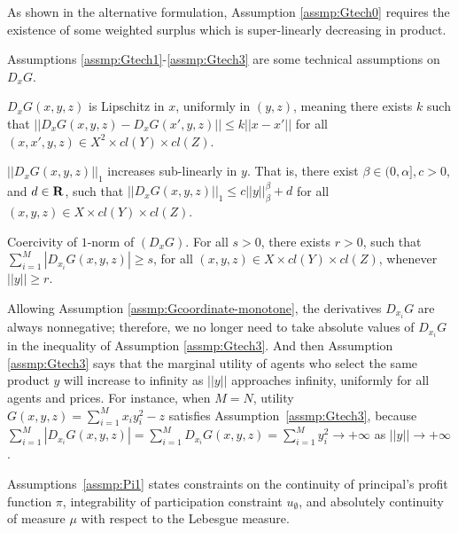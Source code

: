 As shown in the alternative formulation, Assumption \ref{assmp:Gtech0} requires the existence of some weighted surplus which is super-linearly decreasing in product.\medskip


Assumptions \ref{assmp:Gtech1}-\ref{assmp:Gtech3} are some technical assumptions on $D_xG$.\medskip



\begin{assumption}\label{assmp:Gtech1}
	{$D_x G(x,y,z)$ is Lipschitz in $x$},
	uniformly in $(y,z)$, meaning there exists $k$ such that
	$||D_xG(x,y,z)-D_x G(x',y,z)||\le k||x-x'||$ %
	for all $(x, x',y, z)\in X^2\times cl(Y) \times cl(Z)$.
\end{assumption}


\begin{assumption}\label{assmp:Gtech2}
	$||D_x G(x,y,z)||_{1}$ increases sub-linearly in $y$. That is, there exist $ \beta \in (0, \alpha], c>0$, and $ d\in {\mathbf R}$, such that $||D_x G(x,y,z)||_{1}\le c||y||_{\beta}^{\beta} +d$ for all $ (x, y, z)\in X\times cl(Y) \times cl(Z)$.
\end{assumption}


\begin{assumption}\label{assmp:Gtech3}
	Coercivity of {$1$-norm} of $(D_xG)$. For all $ s>0$, there exists $r>0$, such that $\sum_{i=1}^{M} |D_{x_i}G(x,y,z)|\ge s$, for all $(x, y, z)\in X\times  cl(Y) \times cl(Z)$, whenever $||y||\ge r$.
\end{assumption}


{Allowing Assumption \ref{assmp:Gcoordinate-monotone}, {the derivatives $D_{x_i}G$ are always nonnegative; therefore,} we no longer need to take absolute values of $D_{x_i}G$ in the inequality of Assumption \ref{assmp:Gtech3}.} And then Assumption \ref{assmp:Gtech3} says that the marginal utility of agents who select the same product $y$ will increase to infinity as $||y||$ approaches infinity, uniformly for all agents and prices. {For instance, when $M = N$, utility $G(x,y,z) = \sum_{i=1}^{M} x_iy_i^2 -z $ satisfies Assumption~\ref{assmp:Gtech3}, because $\sum_{i=1}^{M} |D_{x_i}G(x,y,z)| = \sum_{i=1}^{M} D_{x_i}G(x,y,z) = \sum_{i=1}^{M} y_i^2 \rightarrow +\infty$ as $||y|| \rightarrow + \infty$. }\medskip




Assumptions~\ref{assmp:Pi1} states constraints on the continuity of principal's profit function $\pi$, integrability of participation constraint $u_{\emptyset}$, and absolutely continuity of measure $\mu$ with respect to the Lebesgue measure. 

